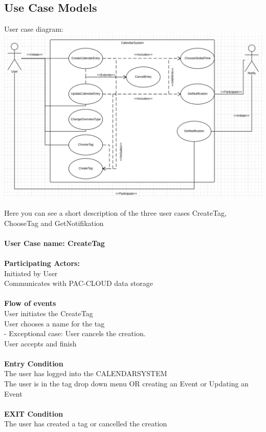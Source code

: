 \subsection{Use Case Models}
User case diagram:\\
\includegraphics[scale=0.6]{CalendarSystemUseCaseDiagram}\\\\
Here you can see a short description of the three user cases CreateTag, ChooseTag and GetNotifikation\\\\
\textbf{User Case name: CreateTag}\\
\HRule \\[0.4cm]
\textbf{Participating Actors:}\\
Initiated by User\\
Communicates with PAC-CLOUD data storage\\
\HRule \\[0.4cm]
\textbf{Flow of events}\\
User initiates the CreateTag\\
User chooses a name for the tag\\
 - Exceptional case: User cancels the creation.\\
User accepts and finish\\
\HRule \\[0.4cm]
\textbf{Entry Condition}\\
The user has logged into the CALENDARSYSTEM\\
The user is in the tag drop down menu OR creating an Event or Updating an Event\\
\HRule \\[0.4cm]
\textbf{EXIT Condition}\\
The user has created a tag or cancelled the creation\\\\\\
